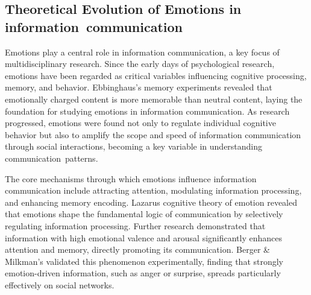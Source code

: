 \subsection{Theoretical Evolution of Emotions in information~communication}
Emotions play a central role in information communication, a key focus of multidisciplinary research. Since the early days of psychological research, emotions have been regarded as critical variables influencing cognitive processing, memory, and behavior. Ebbinghaus’s \cite{ebbinghaus1913memory} memory experiments revealed that emotionally charged content is more memorable than neutral content, laying the foundation for studying emotions in information communication. As research progressed, emotions were found not only to regulate individual cognitive behavior but also to amplify the scope and speed of information communication through social interactions, becoming a key variable in understanding communication~patterns.

The core mechanisms through which emotions influence information communication include attracting attention, modulating information processing, and enhancing memory encoding. Lazarus\cite{lazarus1991emotion} cognitive theory of emotion revealed that emotions shape the fundamental logic of communication by selectively regulating information processing. Further research demonstrated that information with high emotional valence and arousal significantly enhances attention and memory, directly promoting its communication. Berger \& Milkman’s\cite{berger2012makes} validated this phenomenon experimentally, finding that strongly emotion-driven information, such as anger or surprise, spreads particularly effectively on social networks.

